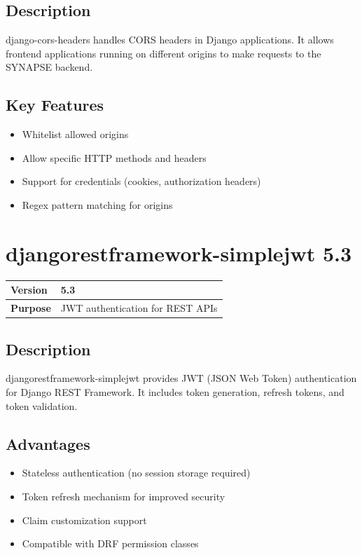 \documentclass[12pt,a4paper]{report}
\begin{document}
\subsection{Description}

django-cors-headers handles CORS headers in Django applications. It allows frontend applications running on different origins to make requests to the SYNAPSE backend.

\subsection{Key Features}

\begin{itemize}
    \item Whitelist allowed origins
    \item Allow specific HTTP methods and headers
    \item Support for credentials (cookies, authorization headers)
    \item Regex pattern matching for origins
\end{itemize}

\section{djangorestframework-simplejwt 5.3}

\begin{tabular}{|p{4cm}|p{10cm}|}
\hline
\textbf{Version} & 5.3 \\
\hline
\textbf{Purpose} & JWT authentication for REST APIs \\
\hline
\end{tabular}

\subsection{Description}

djangorestframework-simplejwt provides JWT (JSON Web Token) authentication for Django REST Framework. It includes token generation, refresh tokens, and token validation.

\subsection{Advantages}

\begin{itemize}
    \item Stateless authentication (no session storage required)
    \item Token refresh mechanism for improved security
    \item Claim customization support
    \item Compatible with DRF permission classes
\end{itemize}
\end{document}
